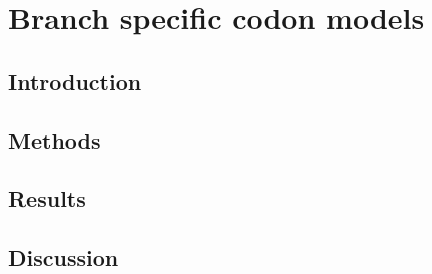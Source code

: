 \chapter{Branch specific codon models}

\section{Introduction}







































\section{Methods}



\section{Results}




\section{Discussion}



